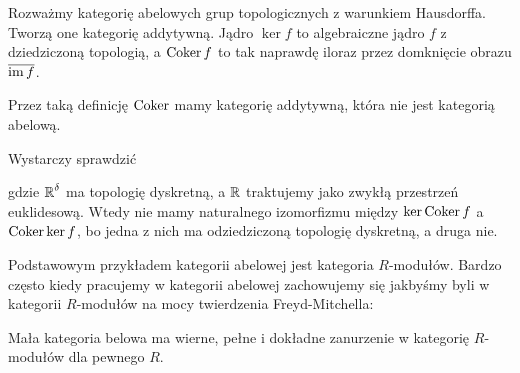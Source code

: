 \begin{example}
  \item Rozważmy kategorię abelowych grup topologicznych z warunkiem Hausdorffa. Tworzą one kategorię addytywną. Jądro $\ker f$ to algebraiczne jądro $f$ z dziedziczoną topologią, a $\operatorname{Coker} f$ to tak naprawdę iloraz przez domknięcie obrazu $\overline{\operatorname{im} f}$.

  \begin{center}\end{center}

  Przez taką definicję $\operatorname{Coker}$ mamy kategorię addytywną, która nie jest kategorią abelową.

  Wystarczy sprawdzić
  \begin{center}\end{center}
  gdzie $\operatorname{\mathbb{R}}^\delta$ ma topologię dyskretną, a $\operatorname{\mathbb{R}}$ traktujemy jako zwykłą przestrzeń euklidesową. Wtedy nie mamy naturalnego izomorfizmu między $\ker \operatorname{Coker} f$ a $\operatorname{Coker}\ker f$, bo jedna z nich ma odziedziczoną topologię dyskretną, a druga nie.

\item Podstawowym przykładem kategorii abelowej jest kategoria $R$-modułów. Bardzo często kiedy pracujemy w kategorii abelowej zachowujemy się jakbyśmy byli w kategorii $R$-modułów na mocy twierdzenia Freyd-Mitchella:

  \begin{dygresja}
    Mała kategoria belowa ma wierne, pełne i dokładne zanurzenie w kategorię $R$-modułów dla pewnego $R$.
  \end{dygresja}
\end{example}


